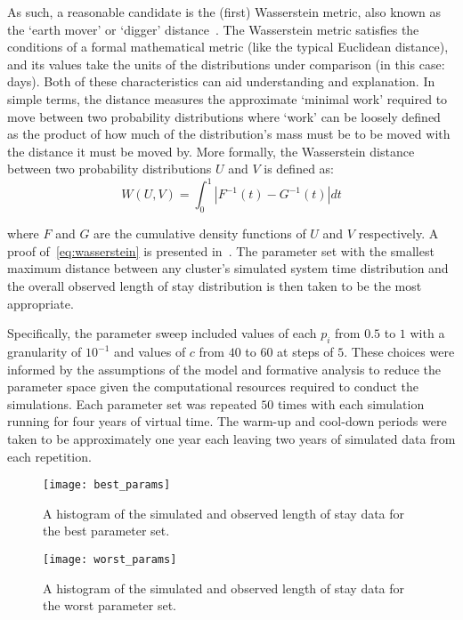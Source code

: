 As such, a reasonable candidate is the (first) Wasserstein metric, also known as
the `earth mover' or `digger' distance~\cite{Vaserstein1969}. The Wasserstein
metric satisfies the conditions of a formal mathematical metric (like the
typical Euclidean distance), and its values take the units of the distributions
under comparison (in this case: days). Both of these characteristics can aid
understanding and explanation. In simple terms, the distance measures the
approximate `minimal work' required to move between two probability
distributions where `work' can be loosely defined as the product of how much of
the distribution's mass must be to be moved with the distance it must be moved
by. More formally, the Wasserstein distance between two probability
distributions \(U\) and \(V\) is defined as:
\begin{equation}\label{eq:wasserstein}
    W(U, V) = \int_{0}^{1} \left\vert F^{-1}(t) - G^{-1}(t) \right\vert dt
\end{equation}

\noindent where \(F\) and \(G\) are the cumulative density functions of \(U\)
and \(V\) respectively. A proof of~\eqref{eq:wasserstein} is presented
in~\cite{Ramdas2017}. The parameter set with the smallest maximum distance
between any cluster's simulated system time distribution and the overall
observed length of stay distribution is then taken to be the most appropriate.

Specifically, the parameter sweep included values of each \(p_i\) from \(0.5\)
to \(1\) with a granularity of \(10^{-1}\) and values of \(c\) from \(40\) to
\(60\) at steps of \(5\). These choices were informed by the assumptions of the
model and formative analysis to reduce the parameter space given the
computational resources required to conduct the simulations. Each parameter set
was repeated \(50\) times with each simulation running for four years of virtual
time. The warm-up and cool-down periods were taken to be approximately one year
each leaving two years of simulated data from each repetition.

\begin{figure}
    \centering%
    \texttt{[image: best\_params]}
    \caption{A histogram of the simulated and observed length of stay data for
             the best parameter set.}\label{fig:best_params}
\end{figure}

\begin{figure}
    \centering%
    \texttt{[image: worst\_params]}
    \caption{A histogram of the simulated and observed length of stay data for
             the worst parameter set.}\label{fig:worst_params}
\end{figure}

